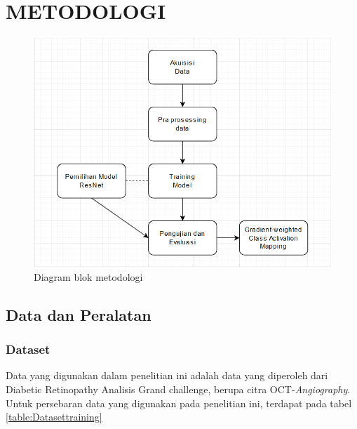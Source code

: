 \chapter{METODOLOGI}
\label{chap:3}

\begin{figure} [H] 
	\centering
	\includegraphics[scale=0.75]{gambar/diagramMethod.png}
	\caption{Diagram blok metodologi}
	\label{fig:diagramMethod}
\end{figure}

\section{Data dan Peralatan}
\label{sec:31}

\subsection{Dataset}
\label{sec:311}
Data yang digunakan dalam penelitian ini adalah data yang diperoleh dari Diabetic Retinopathy Analisis Grand challenge, berupa citra OCT-\emph{Angiography}.
Untuk persebaran data yang digunakan pada penelitian ini, terdapat pada tabel \ref{table:Datasettraining}

